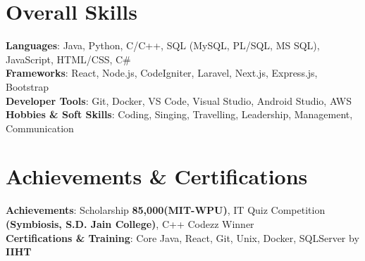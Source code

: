 \documentclass[letterpaper,11pt]{article}
\begin{document}
%
\section{Overall Skills}
 \begin{itemize}[leftmargin=0.15in, label={}]
    \small{\item{
     \textbf{Languages}{: Java, Python, C/C++, SQL (MySQL, PL/SQL, MS SQL), JavaScript, HTML/CSS, C\#} \\
     \textbf{Frameworks}{: React, Node.js, CodeIgniter, Laravel, Next.js, Express.js, Bootstrap} \\
     \textbf{Developer Tools}{: Git, Docker,  VS Code, Visual Studio, Android Studio, AWS} \\
     \textbf{Hobbies \& Soft Skills}{: Coding, Singing, Travelling, Leadership, Management, Communication}\\
    }}
\end{itemize}
\section{Achievements \& Certifications}
 \begin{itemize}[leftmargin=0.15in, label={}]
    \small{\item{
     \textbf{Achievements}{: Scholarship \textbf{85,000\rupee  (MIT-WPU)}, IT Quiz Competition \textbf{(Symbiosis, S.D. Jain College)}, C++ Codezz Winner}\\
     \textbf{Certifications \& Training}{: Core Java, React, Git, Unix, Docker, SQLServer by \textbf{IIHT}}\\
    }}

\end{itemize}
 


\end{document}
